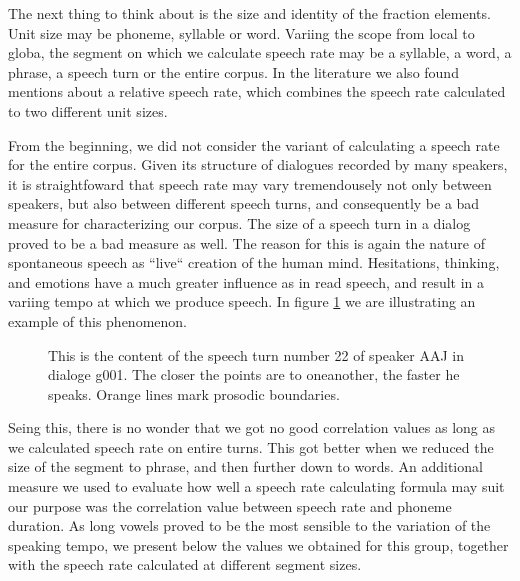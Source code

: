 \documentclass[a4paper]{scrreprt}
\begin{document}
The next thing to think about is the size and identity of the fraction elements. Unit size may be phoneme, syllable or word. Variing the scope from local to globa, the segment on which we calculate speech rate may be a syllable, a word, a phrase, a speech turn or the entire corpus. In the literature \cite{Pfitzinger1998} we also found mentions about a relative speech rate, which combines the speech rate calculated to two different unit sizes.

From the beginning, we did not consider the variant of calculating a speech rate for the entire corpus. Given its structure of dialogues recorded by many speakers, it is straightfoward that speech rate may vary tremendousely not only between speakers, but also between different speech turns, and consequently be a bad measure for characterizing our corpus. The size of a speech turn in a dialog proved to be a bad measure as well. The reason for this is again the nature of spontaneous speech as ``live`` creation of the human mind. Hesitations, thinking, and emotions have a much greater influence as in read speech, and result in a variing tempo at which we produce speech. In figure \ref{fig:SR_example} we are illustrating an example of this phenomenon.

\begin{figure}[htbp]
	\centering
	\noindent{}
	\vspace{-25mm}
	\caption[Example of speech rate variation inside a turn]{This is the content of the speech turn number 22 of speaker AAJ in dialoge g001. The closer the points are to oneanother, the faster he speaks. Orange lines mark prosodic boundaries.}
	\label{fig:SR_example}
\end{figure}

Seing this, there is no wonder that we got no good correlation values as long as we calculated speech rate on entire turns. This got better when we reduced the size of the segment to phrase, and then further down to words. 
An additional measure we used to evaluate how well a speech rate calculating formula may suit our purpose was the correlation value between speech rate and phoneme duration. As long vowels proved to be the most sensible to the variation of the speaking tempo, we present below the values we obtained for this group, together with the speech rate calculated at different segment sizes.
\end{document}
